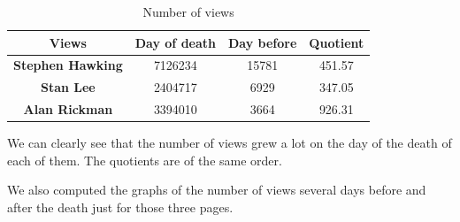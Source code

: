 \documentclass[conference]{IEEEtran}
\begin{document}
\begin{table}[htbp]
\caption{Number of views}
\begin{center}
\begin{tabular}{|c|c|c|c|}
\hline
 Views & Day of death &Day before & Quotient \\
\hline
\textbf{Stephen Hawking} & 7126234 & 15781 &  451.57 \\
\hline
 \textbf{Stan Lee} &2404717 & 6929 &  347.05 \\
\hline
\textbf{Alan Rickman} & 3394010 & 3664 & 926.31 \\
\hline
\end{tabular}
\end{center}
\end{table}

We can clearly see that the number of views grew a lot on the day of the death of each of them. The quotients are of the same order.

\medskip

We also computed the graphs of the number of views several days before and after the death just for those three pages. 
\end{document}
